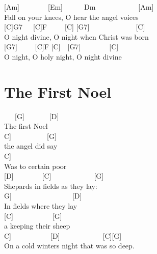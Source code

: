 \documentclass[
  letterpaper,
  a5paper]{memoir}
\begin{document}
{[}Am{]}~~~~~~~~{[}Em{]}~~~~~~Dm~~~~~~~~~~~~{[}Am{]}\\
Fall on your knees, O hear the angel voices\\
{[}C{]}G7~~~{[}C{]}F~~~~~{[}C{]} {[}G7{]}~~~~~~~~~~~~~{[}C{]}\\
O night divine, O night when Christ was born\\
{[}G7{]}~~~~~{[}C{]}F {[}C{]}~~{[}G7{]}~~~~~~~~{[}C{]}\\
O night, O holy night, O night divine

\hypertarget{the-first-noel}{%
\chapter{The First Noel}\label{the-first-noel}}

~~~{[}G{]}~~~~~~~{[}D{]}\\
The first Noel\\
\hspace*{0.333em}\hspace*{0.333em}\hspace*{0.333em}{[}C{]}~~~~~~~~~~{[}G{]}\\
the angel did say\\
\hspace*{0.333em}\hspace*{0.333em}\hspace*{0.333em}\hspace*{0.333em}\hspace*{0.333em}\hspace*{0.333em}{[}C{]}\\
Was to certain poor\\
{[}D{]}~~~~~~~~{[}C{]}~~~~~~~~~~~~{[}G{]}\\
Shepards in fields as they lay:\\
\hspace*{0.333em}\hspace*{0.333em}{[}G{]}~~~~~~~~~~~~~~~~~{[}D{]}\\
In fields where they lay\\
{[}C{]}~~~~~~~~~~~{[}G{]}\\
a keeping their sheep\\
\hspace*{0.333em}\hspace*{0.333em}\hspace*{0.333em}\hspace*{0.333em}{[}C{]}~~~~~~~~~~~{[}D{]}~~~~~~~~~~~~{[}C{]}{[}G{]}\\
On a cold winter\textquotesingle s night that was so deep.
\end{document}
